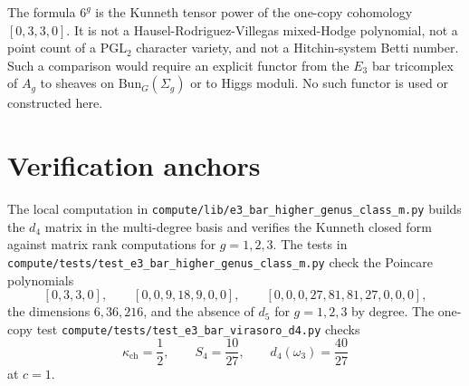 \documentclass[11pt]{amsart}
\theoremstyle{definition}
\providecommand{\kch}{\kappa_{\mathrm{ch}}}
\begin{document}
The formula \(6^g\) is the Kunneth tensor power of the one-copy
cohomology \([0,3,3,0]\). It is not a Hausel-Rodriguez-Villegas
mixed-Hodge polynomial, not a point count of a \(\mathrm{PGL}_2\)
character variety, and not a Hitchin-system Betti number. Such a
comparison would require an explicit functor from the \(E_3\) bar
tricomplex of \(A_g\) to sheaves on \(\mathrm{Bun}_G(\Sigma_g)\) or to
Higgs moduli. No such functor is used or constructed here.

\section{Verification anchors}

The local computation in
\texttt{compute/lib/e3\_bar\_higher\_genus\_class\_m.py} builds the
\(d_4\) matrix in the multi-degree basis and verifies the Kunneth
closed form against matrix rank computations for \(g=1,2,3\). The
tests in
\texttt{compute/tests/test\_e3\_bar\_higher\_genus\_class\_m.py} check
the Poincare polynomials
\[
  [0,3,3,0],\qquad
  [0,0,9,18,9,0,0],\qquad
  [0,0,0,27,81,81,27,0,0,0],
\]
the dimensions \(6,36,216\), and the absence of \(d_5\) for
\(g=1,2,3\) by degree. The one-copy test
\texttt{compute/tests/test\_e3\_bar\_virasoro\_d4.py} checks
\[
  \kch=\frac12,\qquad S_4=\frac{10}{27},\qquad
  d_4(\omega_3)=\frac{40}{27}
\]
at \(c=1\).
\end{document}
